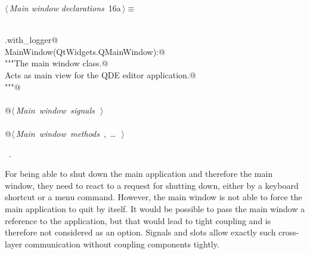 \documentclass[
    a4paper,      %
    10pt,         %
    openright,    %
    notitlepage,  %
    parskip=half, %
]{scrreprt}       %
\theoremstyle{definition}                    %
\begin{document}
\begin{flushleft} \small
\begin{minipage}{\linewidth}\label{scrap5}\raggedright\small
{} $\langle\,${\itshape Main window declarations}\nobreak\ {\footnotesize {16a}}$\,\rangle\equiv$
\vspace{-1exm}
\begin{list}{}{} \item
\mbox{}\lstinline@@\\
\mbox{}\lstinline@common.with_logger@\\
\mbox{}\lstinline@class MainWindow(QtWidgets.QMainWindow):@\\
\mbox{}\lstinline@    """The main window class.@\\
\mbox{}\lstinline@    Acts as main view for the QDE editor application.@\\
\mbox{}\lstinline@    """@\\
\mbox{}\lstinline@@\\
\mbox{}\lstinline@    @\hbox{$\langle\,${\itshape Main window signals}\nobreak\ {\footnotesize {}}$\,\rangle$}\lstinline@@\\
\mbox{}\lstinline@@\\
\mbox{}\lstinline@    @\hbox{$\langle\,${\itshape Main window methods}\nobreak\ {\footnotesize {}, \ldots\ }$\,\rangle$}\lstinline@@\\
\mbox{}\lstinline@@{\NWsep}
\end{list}
\vspace{-1.5ex}
\footnotesize
\begin{list}{}{\setlength{\itemsep}{-\parsep}\setlength{\itemindent}{-\leftmargin}}
\item \NWtxtMacroRefIn\ .

\item{}
\end{list}
\end{minipage}\vspace{4ex}
\end{flushleft}
% 

For being able to shut down the main application and therefore the main window,
they need to react to a request for shutting down, either by a keyboard shortcut
or a menu command. However, the main window is not able to force the main
application to quit by itself. It would be possible to pass the main window a
reference to the application, but that would lead to tight coupling and is
therefore not considered as an option. Signals and slots allow exactly such
cross-layer communication without coupling components tightly.
\end{document}
